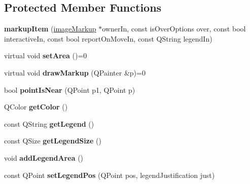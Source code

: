 \subsection*{Protected Member Functions}
\begin{DoxyCompactItemize}
\item 
\hypertarget{classmarkupItem_ac5ef046c02757d6cfed49266497b32a2}{
{\bfseries markupItem} (\hyperlink{classimageMarkup}{imageMarkup} $\ast$ownerIn, const isOverOptions over, const bool interactiveIn, const bool reportOnMoveIn, const QString legendIn)}
\label{classmarkupItem_ac5ef046c02757d6cfed49266497b32a2}

\item 
\hypertarget{classmarkupItem_a9f3e70c7c7369ea2afa8f36201cfc77b}{
virtual void {\bfseries setArea} ()=0}
\label{classmarkupItem_a9f3e70c7c7369ea2afa8f36201cfc77b}

\item 
\hypertarget{classmarkupItem_a4b1a821fc87983e8b25bc1d4c487b2c1}{
virtual void {\bfseries drawMarkup} (QPainter \&p)=0}
\label{classmarkupItem_a4b1a821fc87983e8b25bc1d4c487b2c1}

\item 
\hypertarget{classmarkupItem_a0e3671930904d68b553bd179958359cc}{
bool {\bfseries pointIsNear} (QPoint p1, QPoint p)}
\label{classmarkupItem_a0e3671930904d68b553bd179958359cc}

\item 
\hypertarget{classmarkupItem_a9c1dbafb10ff279848186de48fdecc83}{
QColor {\bfseries getColor} ()}
\label{classmarkupItem_a9c1dbafb10ff279848186de48fdecc83}

\item 
\hypertarget{classmarkupItem_aafb60d38c8b24196c377117cc7b3ea57}{
const QString {\bfseries getLegend} ()}
\label{classmarkupItem_aafb60d38c8b24196c377117cc7b3ea57}

\item 
\hypertarget{classmarkupItem_a739a5fb72adb5cdc6a6a547d3462dac0}{
const QSize {\bfseries getLegendSize} ()}
\label{classmarkupItem_a739a5fb72adb5cdc6a6a547d3462dac0}

\item 
\hypertarget{classmarkupItem_aa9ae690e1670a00866f49a49d084e2b7}{
void {\bfseries addLegendArea} ()}
\label{classmarkupItem_aa9ae690e1670a00866f49a49d084e2b7}

\item 
\hypertarget{classmarkupItem_abf219acf3a16fef988790892ef176abe}{
const QPoint {\bfseries setLegendPos} (QPoint pos, legendJustification just)}
\label{classmarkupItem_abf219acf3a16fef988790892ef176abe}


\end{DoxyCompactItemize}
